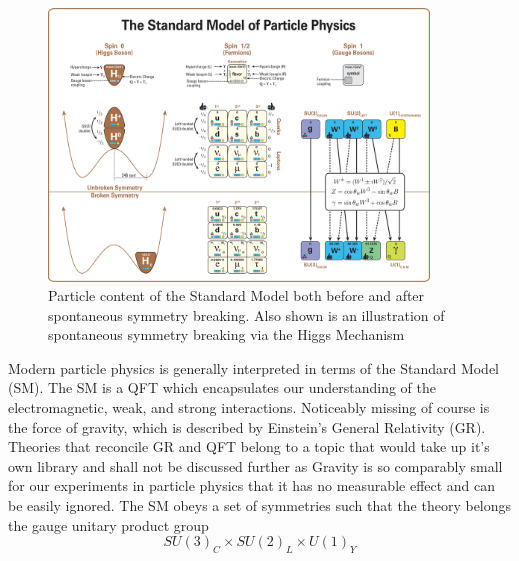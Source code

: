 \begin{figure}
    \centering
    \includegraphics[width=0.90\textwidth]{figs/theory/Standard_Model_Of_Particle_Physics--Most_Complete_Diagram.png}
    \caption[Particle content of the Standard Model both before and after spontaneous symmetry breaking.
    Also shown is an illustration of spontaneous symmetry breaking via the Higgs Mechanism]{Particle content of the Standard Model both before and after spontaneous symmetry breaking.
    Also shown is an illustration of spontaneous symmetry breaking via the Higgs Mechanism~\cite{wiki:xxx}}
    \label{fig:theory:SM}
\end{figure}
Modern particle physics is generally interpreted in terms of the Standard Model (SM).
The SM is a QFT which encapsulates our understanding of the electromagnetic, weak, and strong interactions.
Noticeably missing of course is the force of gravity, which is described by Einstein's General Relativity (GR). 
Theories that reconcile GR and QFT belong to a topic that would take up it's own library and shall not be discussed further as Gravity is so comparably small for our experiments in particle physics that it has no measurable effect and can be easily ignored.
The SM obeys a set of symmetries such that the theory belongs the gauge unitary product group 
\begin{equation}
    SU(3)_{C} \times SU(2)_{L} \times U(1)_{Y}
\end{equation}

